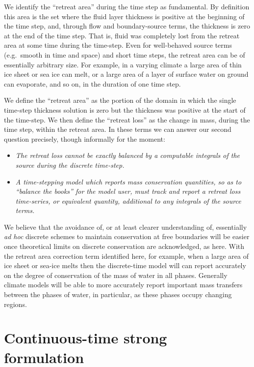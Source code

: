 \documentclass[final,leqno,onefignum,onetabnum]{siamltex1213bueler}
\begin{document}
We identify the ``retreat area'' during the time step as fundamental.  By definition this area is the set where the fluid layer thickness is positive at the beginning of the time step, and, through flow and boundary-source terms, the thickness is zero at the end of the time step.  That is, fluid was completely lost from the retreat area at some time during the time-step.  Even for well-behaved source terms (e.g.~smooth in time and space) and short time steps, the retreat area can be of essentially arbitrary size.  For example, in a varying climate a large area of thin ice sheet or sea ice can melt, or a large area of a layer of surface water on ground can evaporate, and so on, in the duration of one time step.

We define the ``retreat area'' as the portion of the domain in which the single time-step thickness solution is zero but the thickness was positive at the start of the time-step.   We then define the ``retreat loss'' as the change in mass, during the time step, within the retreat area.  In these terms we can answer our second question precisely, though informally for the moment:\begin{itemize}
\item  \emph{The retreat loss cannot be exactly balanced by a computable integrals of the source during the discrete time-step.}
\item  \emph{A time-stepping model which reports mass conservation quantities, so as to ``balance the books'' for the model user, must track and report a retreat loss time-series, or equivalent quantity, additional to any integrals of the source terms.}
\end{itemize}

We believe that the avoidance of, or at least clearer understanding of, essentially \emph{ad hoc} discrete schemes to maintain conservation at free boundaries will be easier once theoretical limits on discrete conservation are acknowledged, as here.  With the retreat area correction term identified here, for example, when a large area of ice sheet or sea-ice melts then the discrete-time model will can report accurately on the degree of conservation of the mass of water in all phases.  Generally climate models will be able to more accurately report important mass transfers between the phases of water, in particular, as these phases occupy changing regions.


\section{Continuous-time strong formulation}  \label{sec:strongform}
\end{document}
